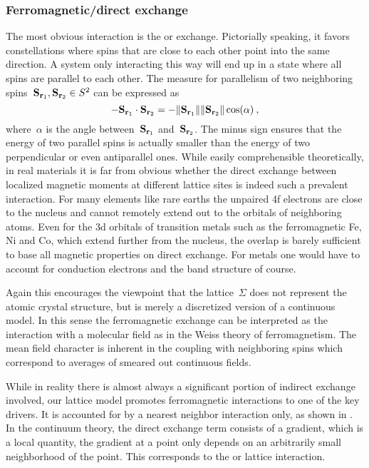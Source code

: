 \subsubsection{Ferromagnetic/direct exchange}

The most obvious interaction is the  or 
exchange. Pictorially speaking, it favors constellations where spins that are
close to each other point into the same direction. A system only interacting
this way will end up in a state where all spins are parallel to each other. The
measure for parallelism of two neighboring spins~$\mathbf{S}_{\mathbf{r}_1}, \mathbf{S}_{\mathbf{r}_2} \in S^2$
can be expressed as
%
\begin{equation}
  -\S_{\r_1} \cdot \S_{\r_2} =
  -\norm{\S_{\r_1}} \norm{\S_{\r_2}} \cos(\alpha) \:,
\end{equation}
%
where~$\alpha$ is the angle between~$\mathbf{S}_{\mathbf{r}_1}$ and~$\mathbf{S}_{\mathbf{r}_2}$. The minus sign
ensures that the energy of two parallel spins is actually smaller than the
energy of two perpendicular or even antiparallel ones. While easily
comprehensible theoretically, in real materials it is far from obvious whether
the direct exchange between localized magnetic moments at different lattice
sites is indeed such a prevalent interaction. For many elements like rare earths
the unpaired 4f electrons are close to the nucleus and cannot remotely extend
out to the orbitals of neighboring atoms. Even for the 3d orbitals of transition
metals such as the ferromagnetic Fe, Ni and Co, which extend further from the
nucleus, the overlap is barely sufficient to base all magnetic properties on
direct exchange. For metals one would have to account for conduction electrons
and the band structure of course.

Again this encourages the viewpoint that the lattice~$\Sigma$ does not represent
the atomic crystal structure, but is merely a discretized version of a
continuous model. In this sense the ferromagnetic exchange can be interpreted as
the interaction with a molecular field as in the Weiss theory of ferromagnetism.
The mean field character is inherent in the coupling with neighboring spins
which correspond to averages of smeared out continuous fields.

While in reality there is almost always a significant portion of indirect
exchange involved, our lattice model promotes ferromagnetic interactions to one
of the key drivers. It is accounted for by a nearest neighbor interaction only,
as shown in . In the continuum theory, the direct exchange
term consists of a gradient, which is a local quantity, \ie{} the gradient at a
point only depends on an arbitrarily small neighborhood of the point. This
corresponds to the  or  lattice
interaction.

